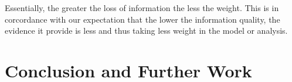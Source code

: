 \documentclass[nojss]{jss}
\begin{document}
Essentially, the greater the loss of information the less the
weight. This is in corcordance with our expectation that the lower the
information quality, the evidence it provide is less and thus taking
less weight in the model or analysis.










\section{Conclusion and Further Work}
\end{document}
